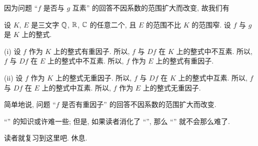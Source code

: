 因为问题 ``$f$ 是否与 $g$ 互素'' 的回答不因系数的范围扩大而改变, 故我们有
\begin{proposition}
    设 $K$, $E$ 是三文字 $\mathbb{Q}$, $\mathbb{R}$, $\mathbb{C}$ 的任意二个, 且 $E$ 的范围不比 $K$ 的范围窄. 设 $f$ 与 $g$ 是 $K$ 上的整式.

    (i) 设 $f$ 作为 $K$ 上的整式有重因子. 所以, $f$ 与 $Df$ 在 $K$ 上的整式中不互素. 所以, $f$ 与 $Df$ 在 $E$ 上的整式中不互素. 所以, $f$ 作为 $E$ 上的整式有重因子.

    (ii) 设 $f$ 作为 $K$ 上的整式无重因子. 所以, $f$ 与 $Df$ 在 $K$ 上的整式中互素. 所以, $f$ 与 $Df$ 在 $E$ 上的整式中互素. 所以, $f$ 作为 $E$ 上的整式无重因子.

    简单地说, 问题 ``$f$ 是否有重因子'' 的回答不因系数的范围扩大而改变.
\end{proposition}

``'' 的知识或许难一些; 但是, 如果读者消化了 ``'', 那么 ``'' 就不会那么难了.

读者就复习到这里吧. 休息.
